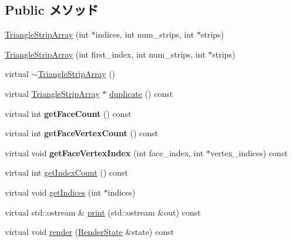 \subsection*{Public メソッド}
\begin{CompactItemize}
\item 
\hyperlink{classm3g_1_1TriangleStripArray_57d4e874819367084aeadb11593c4436}{TriangleStripArray} (int $\ast$indices, int num\_\-strips, int $\ast$strips)
\item 
\hyperlink{classm3g_1_1TriangleStripArray_d2ca9884a6ccf32da3cee977549b5ee0}{TriangleStripArray} (int first\_\-index, int num\_\-strips, int $\ast$strips)
\item 
virtual \hyperlink{classm3g_1_1TriangleStripArray_1cb3853bf79b7710d57044da818d2cde}{$\sim$TriangleStripArray} ()
\item 
virtual \hyperlink{classm3g_1_1TriangleStripArray}{TriangleStripArray} $\ast$ \hyperlink{classm3g_1_1TriangleStripArray_1623fbdfe91eb2e9d4a67bece6a46904}{duplicate} () const 
\item 
\hypertarget{classm3g_1_1TriangleStripArray_f4554e20b080880f27da67c539bb6748}{
virtual int \textbf{getFaceCount} () const }
\label{classm3g_1_1TriangleStripArray_f4554e20b080880f27da67c539bb6748}

\item 
\hypertarget{classm3g_1_1TriangleStripArray_007506f2b3f5563a65e4cfc1007d57ff}{
virtual int \textbf{getFaceVertexCount} () const }
\label{classm3g_1_1TriangleStripArray_007506f2b3f5563a65e4cfc1007d57ff}

\item 
\hypertarget{classm3g_1_1TriangleStripArray_d2721de0db09f6c65d9d4b088a269171}{
virtual void \textbf{getFaceVertexIndex} (int face\_\-index, int $\ast$vertex\_\-indices) const }
\label{classm3g_1_1TriangleStripArray_d2721de0db09f6c65d9d4b088a269171}

\item 
virtual int \hyperlink{classm3g_1_1TriangleStripArray_fe9ae2993ebcdb93d5ff26d57c81b73e}{getIndexCount} () const 
\item 
virtual void \hyperlink{classm3g_1_1TriangleStripArray_650953afac45099025a524ab160b911f}{getIndices} (int $\ast$indices)
\item 
virtual std::ostream \& \hyperlink{classm3g_1_1TriangleStripArray_6fea17fa1532df3794f8cb39cb4f911f}{print} (std::ostream \&out) const 
\item 
virtual void \hyperlink{classm3g_1_1TriangleStripArray_8babc8a79b78615da51161e94029eea9}{render} (\hyperlink{structm3g_1_1RenderState}{RenderState} \&state) const 
\end{CompactItemize}


